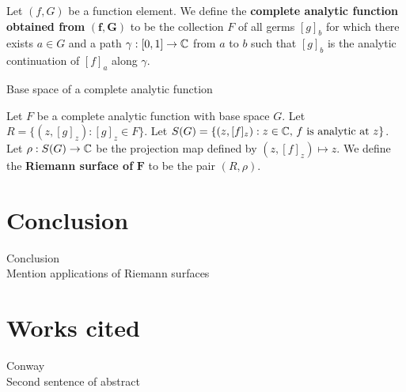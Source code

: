 \documentclass{article}
\begin{document}
\begin{definition}
	\normalfont
	Let $(f, G)$ be a function element. We define the \textbf{complete analytic function obtained from} $\boldsymbol{(f, G)}$ to be the collection $F$ of all germs $[g]_b$ for which there exists $a\in G$ and a path $\gamma:[0, 1]\rightarrow\mathbb{C}$ from $a$ to $b$ such that $[g]_b$ is the analytic continuation of $[f]_a$ along $\gamma$.
\end{definition}
\begin{definition}
	\normalfont
	Base space of a complete analytic function
\end{definition}
\begin{definition}
	\normalfont
	Let $F$ be a complete analytic function with base space $G$. Let $R = \{(z, [g]_z) : [g]_z\in F\}$. Let $S(G) = \{(z, [f]_z) : z\in\mathbb{C}\text{, }f\text{ is analytic at }z\}$. Let $\rho:S(G)\rightarrow\mathbb{C}$ be the projection map defined by $(z, [f]_z)\mapsto z$. We define the \textbf{Riemann surface of} $\boldsymbol F$ to be the pair $(R, \rho)$.
\end{definition}

\section*{Conclusion}
Conclusion\\
Mention applications of Riemann surfaces

\section*{Works cited}
Conway\\
Second sentence of abstract
\end{document}
